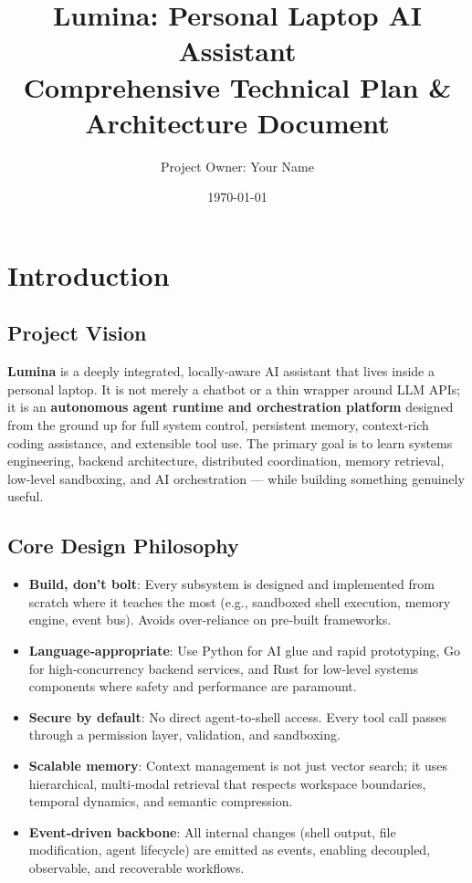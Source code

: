 \documentclass[12pt,a4paper]{article}
\title{\Huge \textbf{Lumina: Personal Laptop AI Assistant}\\[0.3cm]
\Large Comprehensive Technical Plan \& Architecture Document}
\author{Project Owner: Your Name}
\date{\today}
\begin{document}
\maketitle

\tableofcontents
\newpage

\section{Introduction}
\subsection{Project Vision}
\textbf{Lumina} is a deeply integrated, locally‑aware AI assistant that lives inside a personal laptop. It is not merely a chatbot or a thin wrapper around LLM APIs; it is an \textbf{autonomous agent runtime and orchestration platform} designed from the ground up for full system control, persistent memory, context‑rich coding assistance, and extensible tool use. The primary goal is to learn systems engineering, backend architecture, distributed coordination, memory retrieval, low‑level sandboxing, and AI orchestration — while building something genuinely useful.

\subsection{Core Design Philosophy}
\begin{itemize}[leftmargin=*]
    \item \textbf{Build, don’t bolt}: Every subsystem is designed and implemented from scratch where it teaches the most (e.g., sandboxed shell execution, memory engine, event bus). Avoids over‑reliance on pre‑built frameworks.
    \item \textbf{Language‑appropriate}: Use Python for AI glue and rapid prototyping, Go for high‑concurrency backend services, and Rust for low‑level systems components where safety and performance are paramount.
    \item \textbf{Secure by default}: No direct agent‑to‑shell access. Every tool call passes through a permission layer, validation, and sandboxing.
    \item \textbf{Scalable memory}: Context management is not just vector search; it uses hierarchical, multi‑modal retrieval that respects workspace boundaries, temporal dynamics, and semantic compression.
    \item \textbf{Event‑driven backbone}: All internal changes (shell output, file modification, agent lifecycle) are emitted as events, enabling decoupled, observable, and recoverable workflows.
\end{itemize}
\end{document}
